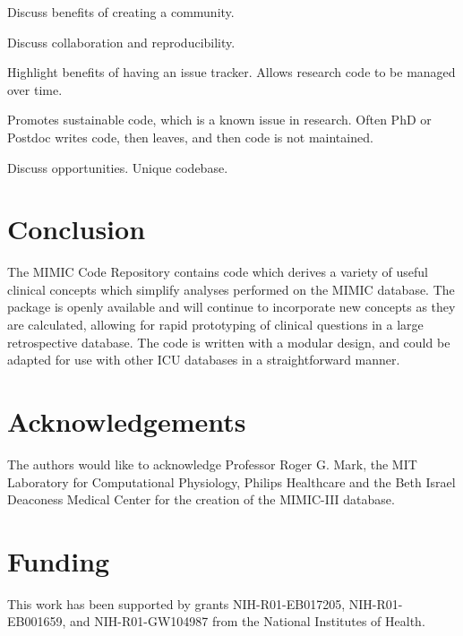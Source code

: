\documentclass{bioinfo}
\begin{document}
Discuss benefits of creating a community.

Discuss collaboration and reproducibility.

Highlight benefits of having an issue tracker. Allows research code to be managed over time. 

Promotes sustainable code, which is a known issue in research. Often PhD or Postdoc writes code, then leaves, and then code is not maintained.

Discuss opportunities. Unique codebase. 

\section{Conclusion}

The MIMIC Code Repository contains code which derives a variety of useful clinical concepts which simplify analyses performed on the MIMIC database. The package is openly available and will continue to incorporate new concepts as they are calculated, allowing for rapid prototyping of clinical questions in a large retrospective database. The code is written with a modular design, and could be adapted for use with other ICU databases in a straightforward manner.  \\

\section*{Acknowledgements}

The authors would like to acknowledge Professor Roger G. Mark, the MIT Laboratory for Computational Physiology, Philips Healthcare and the Beth Israel Deaconess Medical Center for the creation of the MIMIC-III database.%

\section*{Funding}

This work has been supported by grants NIH-R01-EB017205, NIH-R01-EB001659, and NIH-R01-GW104987 from the National Institutes of Health.%

%
%
%
%
%
%
%
%
%
\end{document}
